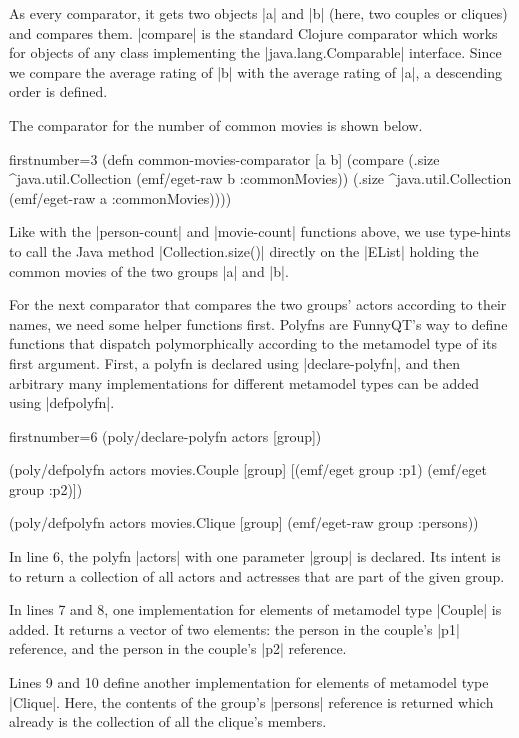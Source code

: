 \documentclass[a4paper]{article}
\newcommand{\code}{\clojureinline}
\begin{document}
As every comparator, it gets two objects \code|a| and \code|b| (here, two
couples or cliques) and compares them.  \code|compare| is the standard Clojure
comparator which works for objects of any class implementing the
\code|java.lang.Comparable| interface.  Since we compare the average rating of
\code|b| with the average rating of \code|a|, a descending order is defined.

The comparator for the number of common movies is shown below.

\begin{clojurecode*}{firstnumber=3}
(defn common-movies-comparator [a b]
  (compare (.size ^java.util.Collection (emf/eget-raw b :commonMovies))
           (.size ^java.util.Collection (emf/eget-raw a :commonMovies))))
\end{clojurecode*}

Like with the \code|person-count| and \code|movie-count| functions above, we
use type-hints to call the Java method \code|Collection.size()| directly on the
\code|EList| holding the common movies of the two groups \code|a| and \code|b|.

For the next comparator that compares the two groups' actors according to their
names, we need some helper functions first.  Polyfns are FunnyQT's way to
define functions that dispatch polymorphically according to the metamodel type
of its first argument.  First, a polyfn is declared using
\code|declare-polyfn|, and then arbitrary many implementations for different
metamodel types can be added using \code|defpolyfn|.

\begin{clojurecode*}{firstnumber=6}
(poly/declare-polyfn actors [group])

(poly/defpolyfn actors movies.Couple [group]
  [(emf/eget group :p1) (emf/eget group :p2)])

(poly/defpolyfn actors movies.Clique [group]
  (emf/eget-raw group :persons))
\end{clojurecode*}

In line 6, the polyfn \code|actors| with one parameter \code|group| is
declared.  Its intent is to return a collection of all actors and actresses
that are part of the given group.

In lines 7 and 8, one implementation for elements of metamodel type
\code|Couple| is added.  It returns a vector of two elements: the person in the
couple's \code|p1| reference, and the person in the couple's \code|p2|
reference.

Lines 9 and 10 define another implementation for elements of metamodel type
\code|Clique|.  Here, the contents of the group's \code|persons| reference is
returned which already is the collection of all the clique's members.
\end{document}
